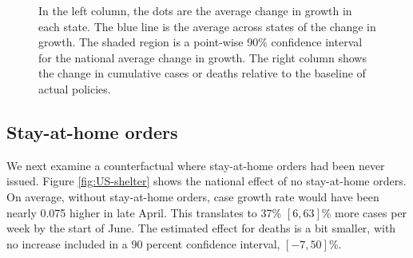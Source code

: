 \documentclass[11pt,reqno,letter]{amsart}
\theoremstyle{definition}
\begin{document}
\begin{figure}[ht]
\begin{minipage}{\linewidth}
    \begin{flushleft}
      \footnotesize In the left column, the dots are the average
      change in growth in each state. The blue line is the average
      across states of the change in growth. The shaded region is a
      point-wise 90\% confidence interval for the national average
      change in growth. The right column shows the change in
      cumulative cases or deaths relative to the baseline of actual policies.
    \end{flushleft}
  \end{minipage}
\end{figure}


\subsection{Stay-at-home orders}

We next examine a counterfactual where stay-at-home orders had been never
issued.  Figure \ref{fig:US-shelter} shows the national effect of no
stay-at-home orders. On average, without stay-at-home orders, case
growth rate would have been nearly 0.075 higher in late April. This
translates to 37\% $[6,63]$\% more cases per week by the start of June. The
estimated effect for deaths is a bit smaller, with no
increase included in a 90 percent confidence interval, $[-7,50]$\%.
\end{document}

